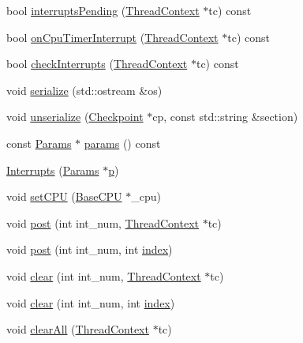 \begin{DoxyCompactItemize}
bool \hyperlink{classMipsISA_1_1Interrupts_a79de56931b0c5eff3edb7585b2b14286}{interruptsPending} (\hyperlink{classThreadContext}{ThreadContext} $\ast$tc) const 
\item 
bool \hyperlink{classMipsISA_1_1Interrupts_a3dfe5717c5a726738b098c9b5c747a44}{onCpuTimerInterrupt} (\hyperlink{classThreadContext}{ThreadContext} $\ast$tc) const 
\item 
bool \hyperlink{classMipsISA_1_1Interrupts_af3c66fb49fec598cf78aaec29d764952}{checkInterrupts} (\hyperlink{classThreadContext}{ThreadContext} $\ast$tc) const 
\item 
void \hyperlink{classMipsISA_1_1Interrupts_a53e036786d17361be4c7320d39c99b84}{serialize} (std::ostream \&os)
\item 
void \hyperlink{classMipsISA_1_1Interrupts_af22e5d6d660b97db37003ac61ac4ee49}{unserialize} (\hyperlink{classCheckpoint}{Checkpoint} $\ast$cp, const std::string \&section)
\item 
const \hyperlink{classMipsISA_1_1Interrupts_a2d2df962f437c169ec932010a88ab884}{Params} $\ast$ \hyperlink{classMipsISA_1_1Interrupts_acd3c3feb78ae7a8f88fe0f110a718dff}{params} () const 
\item 
\hyperlink{classMipsISA_1_1Interrupts_a3d148759405b99148e0c34750966edb1}{Interrupts} (\hyperlink{classMipsISA_1_1Interrupts_a2d2df962f437c169ec932010a88ab884}{Params} $\ast$\hyperlink{namespaceMipsISA_a37d3f683959086eac7bcf24a002a9fb8}{p})
\item 
void \hyperlink{classMipsISA_1_1Interrupts_a2ab8c6aed9969bc58d6aa2427d442cc4}{setCPU} (\hyperlink{classBaseCPU}{BaseCPU} $\ast$\_\-cpu)
\item 
void \hyperlink{classMipsISA_1_1Interrupts_a03cb6c87689ac9000f54a7eacfa2c730}{post} (int int\_\-num, \hyperlink{classThreadContext}{ThreadContext} $\ast$tc)
\item 
void \hyperlink{classMipsISA_1_1Interrupts_a24c6c4fbdc0605bcd015ce06f194e4b4}{post} (int int\_\-num, int \hyperlink{namespaceMipsISA_ae6714ce3c5ef82205cecbd410556edf3}{index})
\item 
void \hyperlink{classMipsISA_1_1Interrupts_a10ed3ba8ce3bd81e1732b0a9a7087a27}{clear} (int int\_\-num, \hyperlink{classThreadContext}{ThreadContext} $\ast$tc)
\item 
void \hyperlink{classMipsISA_1_1Interrupts_af60c3484087379d0330467d77f6cbaae}{clear} (int int\_\-num, int \hyperlink{namespaceMipsISA_ae6714ce3c5ef82205cecbd410556edf3}{index})
\item 
void \hyperlink{classMipsISA_1_1Interrupts_a1ff2f31dc81c8fa68f3d8abb099f3a25}{clearAll} (\hyperlink{classThreadContext}{ThreadContext} $\ast$tc)

\end{DoxyCompactItemize}
